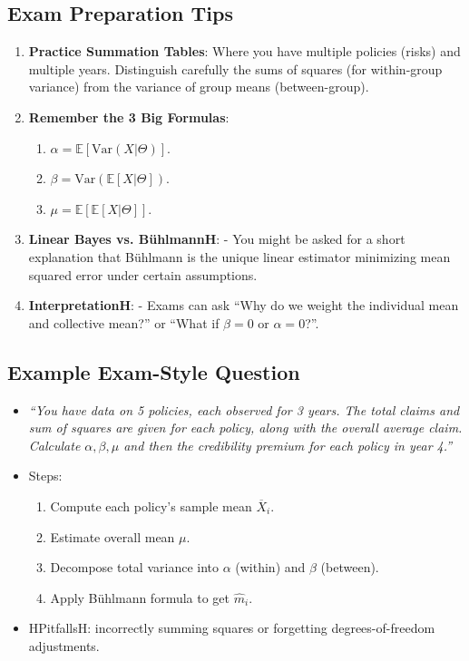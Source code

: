 \documentclass[13pt,a4paper]{article}
\begin{document}
\subsection{Exam Preparation Tips}
\begin{enumerate}
  \item \textbf{Practice Summation Tables}: Where you have multiple policies (risks) and multiple years. Distinguish carefully the sums of squares (for within-group variance) from the variance of group means (between-group).
  \item \textbf{Remember the 3 Big Formulas}:
    \begin{enumerate}
      \item \(\alpha = \mathbb{E}[\mathrm{Var}(X|\Theta)]\).
      \item \(\beta = \mathrm{Var}(\mathbb{E}[X|\Theta])\).
      \item \(\mu = \mathbb{E}[\mathbb{E}[X|\Theta]]\).
    \end{enumerate}
  \item \textbf{Linear Bayes vs. B\"{u}hlmannH}:  
    - You might be asked for a short explanation that B\"{u}hlmann is the unique linear estimator minimizing mean squared error under certain assumptions.  
  \item \textbf{InterpretationH}:
    - Exams can ask “Why do we weight the individual mean and collective mean?” or “What if \(\beta=0\) or \(\alpha=0\)?”.
\end{enumerate}

\subsection{Example Exam-Style Question}
\begin{itemize}
  \item \emph{“You have data on 5 policies, each observed for 3 years. The total claims and sum of squares are given for each policy, along with the overall average claim. Calculate \(\alpha,\beta,\mu\) and then the credibility premium for each policy in year 4.”}
  \item Steps:
    \begin{enumerate}
      \item Compute each policy’s sample mean \(\overline{X}_i\).
      \item Estimate overall mean \(\mu\).
      \item Decompose total variance into \(\alpha\) (within) and \(\beta\) (between).
      \item Apply B\"{u}hlmann formula to get \(\hat{m}_i\).
    \end{enumerate}
  \item HPitfallsH: incorrectly summing squares or forgetting degrees-of-freedom adjustments.  
\end{itemize}
\end{document}
